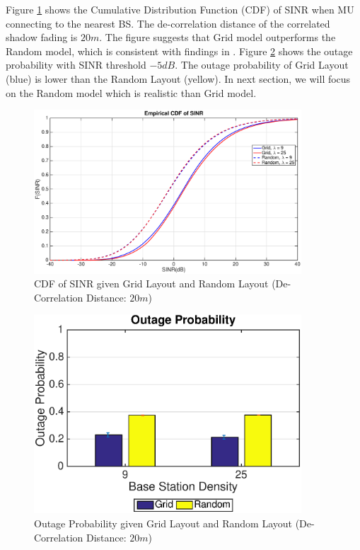 \par Figure \ref{cdf1} shows the Cumulative Distribution Function (CDF) of SINR when MU connecting to the nearest BS. The de-correlation distance of the correlated shadow fading is $20m$. The figure suggests that Grid model outperforms the Random model, which is consistent with findings in \cite{andrews2011tractable}. Figure \ref{outage1} shows the outage probability with SINR threshold $-5dB$. The outage probability of Grid Layout (blue) is lower than the Random Layout (yellow). In next section, we will focus on the Random model which is realistic than Grid model.
\begin{figure}
\centering
\includegraphics[width=10cm]{GridVSRandom.eps}
\caption{CDF of SINR given Grid Layout and Random Layout (De-Correlation Distance: $20m$)}
\label{cdf1}
\end{figure}
\begin{figure}
\centering
\includegraphics[width=10cm]{OutageProbGridVSRandom.eps}
\caption{Outage Probability given Grid Layout and Random Layout (De-Correlation Distance: $20m$)}
\label{outage1}
\end{figure}


